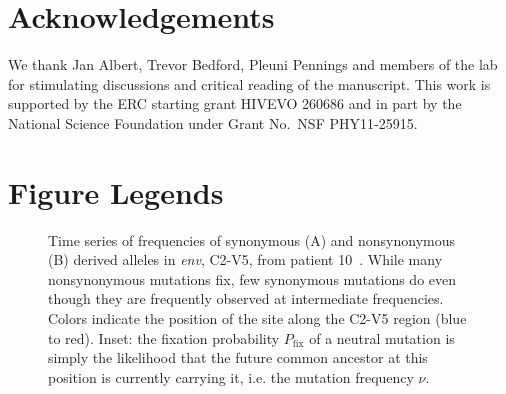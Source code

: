 \documentclass[10pt]{article}
\newcommand{\pfix}{P_{\mathrm{fix}}}
\newcommand{\env}{\textit{env}}
\newcommand{\shankaregion}{C2-V5}
\begin{document}
\section*{Acknowledgements}
We thank Jan Albert, Trevor Bedford, Pleuni Pennings and members of the lab for 
stimulating discussions and critical reading of the manuscript.
This work is supported by the ERC starting grant HIVEVO 260686 and 
in part by the National Science Foundation under Grant No.~NSF PHY11-25915.



\section*{Figure Legends}
\begin{figure}[!ht]
\begin{center}
\caption{Time series of frequencies
of synonymous (A) and nonsynonymous (B) derived alleles in \env, 
\shankaregion, from patient 10~\cite{shankarappa_consistent_1999}.
While many nonsynonymous mutations  fix, few synonymous
mutations do even though they are frequently observed at intermediate
frequencies. Colors indicate the position of the site along the \shankaregion{} region
(blue to red). Inset: the fixation probability $\pfix$ of a neutral
mutation is simply the likelihood that the future common ancestor at this 
position is currently carrying it, i.e. the mutation frequency $\nu$.}
\label{fig:aft}
\end{center}
\end{figure}
\end{document}

